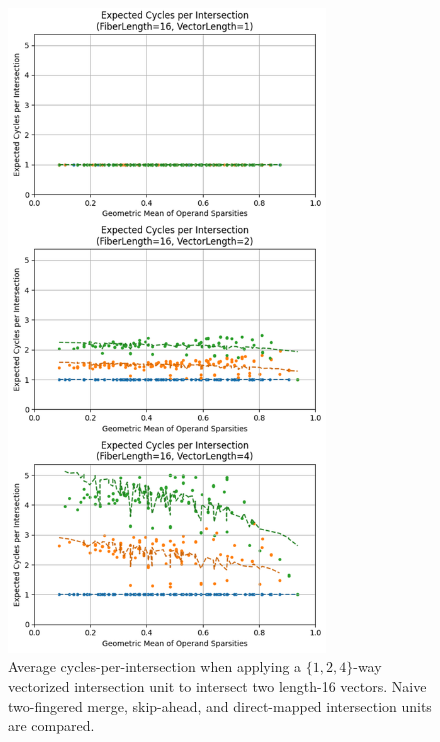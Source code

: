 \begin{figure}[H]
\includegraphics[width=0.75\textwidth]{figures/expected_cycles_F16.png}
\caption{Average cycles-per-intersection when applying a $\{1,2,4\}$-way vectorized intersection unit to intersect two length-16 vectors. Naive two-fingered merge, skip-ahead, and direct-mapped intersection units are compared.}
\label{fig:expected_cycles_F16}
\end{figure}

\newpage

